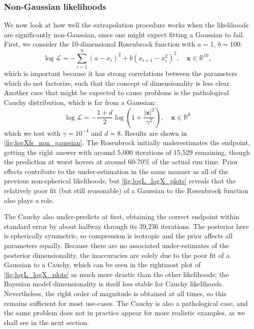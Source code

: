 \documentclass[usenatbib]{mnras}
\newcommand{\Like}{\mathcal{L}}
\begin{document}
\subsubsection{Non-Gaussian likelihoods}
We now look at how well the extrapolation procedure works when the likelihoods are significantly non-Gaussian, since one might expect fitting a Gaussian to fail. 
First, we consider the 10-dimensional Rosenbrock function with $a = 1$,  $b = 100$:
\begin{equation}
    \log \Like = - \sum_{i = 1}^{9} \left(a - x_i\right)^2 + b\left(x_{i+1} - x_i^2\right)^2, \quad \bm{x} \in \mathbb{R}^{10},
\end{equation}
which is important because it has strong correlations between the parameters which do not factorize, such that the concept of dimensionality is less clear. Another case that might be expected to cause problems is the pathological Cauchy distribution, which is far from a Gaussian:
\begin{equation}
    \log\Like = - \frac{1+d}{2} \log \left( 1 + \frac{|\bm{x}|^2}{\gamma^2}\right), \quad \bm{x} \in \mathbb{R}^8
\end{equation}
which we test with $\gamma = 10^{-4}$ and $d = 8$. Results are shown in \cref{fig:logXfs_non_gaussian}. The Rosenbrock initially underestimates the endpoint, getting the right answer with around 5,000 iterations of 15,529 remaining, though the prediction at worst hovers at around 60-70\% of the actual run time. Prior effects contribute to the under-estimation in the same manner as all of the previous non-spherical likelihoods, but \cref{fig:logL_logX_plots} reveals that the relatively poor fit (but still reasonable) of a Gaussian to the Rosenbrock function also plays a role.
\par
The Cauchy also under-predicts at first, obtaining the correct endpoint within standard error by about halfway through its 39,236 iterations. The posterior here is spherically symmetric, so compression is isotropic and the prior affects all parameters equally. Because there are no associated under-estimates of the posterior dimensionality, the inaccuracies are solely due to the poor fit of a Gaussian to a Cauchy, which can be seen in the rightmost plot of \cref{fig:logL_logX_plots} as much more drastic than the other likelihoods; the Bayesian model dimensionality is itself less stable for Cauchy likelihoods. Nevertheless, the right order of magnitude is obtained at all times, so this remains sufficient for most use-cases. The Cauchy is also a pathological case, and the same problem does not in practice appear for more realistic examples, as we shall see in the next section.
\end{document}
